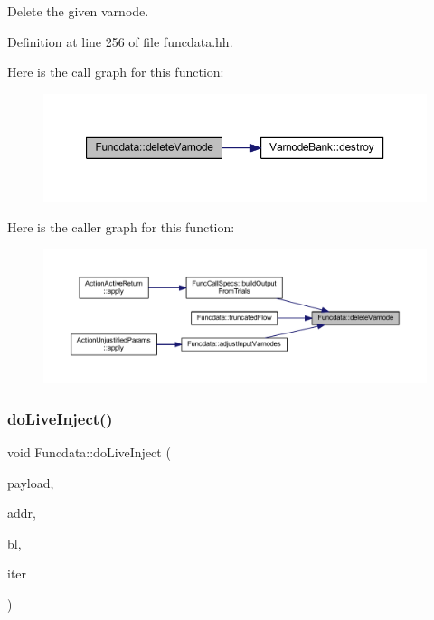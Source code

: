 Delete the given varnode. 



Definition at line 256 of file funcdata.\+hh.

Here is the call graph for this function\+:
\nopagebreak
\begin{figure}[H]
\begin{center}
\leavevmode
\includegraphics[width=350pt]{class_funcdata_aa8657c4c04279316593adc6d2f389be5_cgraph}
\end{center}
\end{figure}
Here is the caller graph for this function\+:
\nopagebreak
\begin{figure}[H]
\begin{center}
\leavevmode
\includegraphics[width=350pt]{class_funcdata_aa8657c4c04279316593adc6d2f389be5_icgraph}
\end{center}
\end{figure}
\mbox{\label{class_funcdata_adb1dd79d78141f89d374e570de21d690}} 
\subsubsection{\texorpdfstring{doLiveInject()}{doLiveInject()}}
{\footnotesize\ttfamily void Funcdata\+::do\+Live\+Inject (\begin{DoxyParamCaption}\item[{\mbox{\hyperlink{class_inject_payload}{Inject\+Payload}} $\ast$}]{payload,  }\item[{const \mbox{\hyperlink{class_address}{Address}} \&}]{addr,  }\item[{\mbox{\hyperlink{class_block_basic}{Block\+Basic}} $\ast$}]{bl,  }\item[{list$<$ \mbox{\hyperlink{class_pcode_op}{Pcode\+Op}} $\ast$ $>$\+::iterator}]{iter }\end{DoxyParamCaption})}



